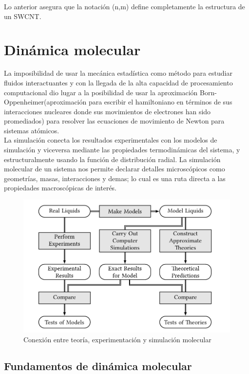 Lo anterior asegura que la notación (n,m) define completamente la estructura de un SWCNT.

\begingroup
\let\clearpage\relax
\chapter{Dinámica molecular}
\endgroup

La imposibilidad de usar la mecánica estadística como método para estudiar fluidos interactuantes y con la llegada de la alta capacidad de procesamiento computacional dio lugar a la posibilidad de usar la aproximación Born-Oppenheimer(aproximación para escribir el hamiltoniano en términos de sus interacciones nucleares donde sus movimientos de electrones han sido promediados) para resolver las ecuaciones de movimiento de Newton para sistemas atómicos. \\

La simulación conecta los resultados experimentales con los modelos de simulación y viceversa mediante las propiedades termodinámicas del sistema, y estructuralmente usando la función de distribución radial. La simulación molecular de un sistema nos permite declarar detalles microscópicos como geometrías, masas, interacciones y demas; lo cual es una ruta directa a las propiedades macroscópicas de interés.\\


\begin{figure}[!h]
    \centering
    \includegraphics[width=.7\textwidth,keepaspectratio=true]{conexionteoriaexpsim.png}
    \caption{Conexión entre teoría, experimentación y simulación molecular \cite{Allen2017}}
    \label{fig:conteexpsim}
\end{figure}

\section{Fundamentos de dinámica molecular}


